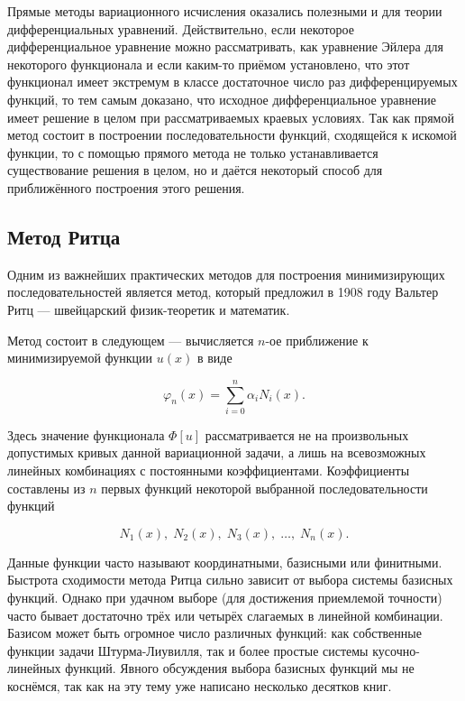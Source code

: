 \documentclass{article}
\begin{document}
Прямые методы вариационного исчисления оказались полезными и для теории дифференциальных уравнений. Действительно, если некоторое дифференциальное уравнение можно рассматривать, как уравнение Эйлера для некоторого функционала и если каким-то приёмом установлено, что этот функционал имеет экстремум в классе достаточное число раз дифференцируемых функций, то тем самым доказано, что исходное дифференциальное уравнение имеет решение в целом при рассматриваемых краевых условиях. Так как прямой метод состоит в построении последовательности функций, сходящейся к искомой функции, то с помощью прямого метода не только устанавливается существование решения в целом, но и даётся некоторый способ для приближённого построения этого решения.


\subsection{Метод Ритца}

Одним из важнейших практических методов для построения минимизирующих последовательностей является метод, который предложил в 1908 году Вальтер Ритц --- швейцарский физик-теоретик и математик.

Метод состоит в следующем --- вычисляется $n$-ое приближение к минимизируемой функции $u(x)$ в виде

\begin{displaymath}
	\varphi_{n}(x) = \sum_{i=0}^n \alpha_{i} N_{i}(x).
\end{displaymath}

\noindent Здесь значение функционала $\Phi[u]$ рассматривается не на произвольных допустимых кривых данной вариационной задачи, а лишь на всевозможных линейных комбинациях с постоянными коэффициентами. Коэффициенты составлены из $n$ первых функций некоторой выбранной последовательности функций

\begin{displaymath}
	N_{1}(x), \; N_{2}(x), \; N_{3}(x), \; \ldots, \; N_{n}(x).
\end{displaymath}

\begin{info}
	Данные функции часто называют координатными, базисными или финитными. Быстрота сходимости метода Ритца сильно зависит от выбора системы базисных функций. Однако при удачном выборе (для достижения приемлемой точности) часто бывает достаточно трёх или четырёх слагаемых в линейной комбинации. Базисом может быть огромное число различных функций: как собственные функции задачи Штурма-Лиувилля, так и более простые системы кусочно-линейных функций. Явного обсуждения выбора базисных функций мы не коснёмся, так как на эту тему уже написано несколько десятков книг.
\end{info}
\end{document}
